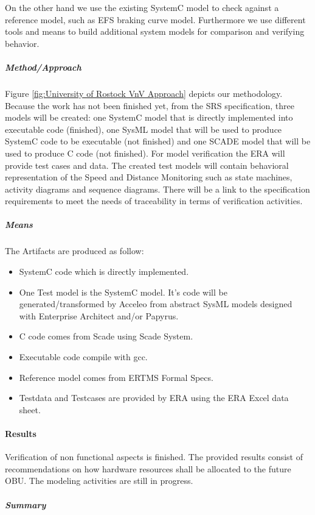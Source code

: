 \documentclass{article}
\begin{document}
On the other hand we use the existing SystemC model to check against a reference model, such as EFS braking curve model. Furthermore we use different tools and means to build additional system models for comparison and verifying behavior.

\subparagraph{Method/Approach}

Figure \ref{fig:University of Rostock VnV Approach} depicts our methodology. Because the work has not been finished yet, from the SRS
specification, three models will be created: one SystemC model that is directly implemented into executable code (finished), one SysML model that will be used to produce SystemC code to be executable (not finished) and one SCADE model that will be used to produce C code (not finished). For model verification the ERA will provide test cases and data. The created test models will contain behavioral representation of the Speed and Distance Monitoring such as state machines, activity diagrams and sequence diagrams. There will be a link to the specification requirements to meet the needs of traceability in terms of verification activities.


\subparagraph{Means}

The Artifacts are produced as follow:
\begin{itemize}
\item SystemC code which is directly implemented.
\item One Test model is the SystemC model. It's code will be generated/transformed by Acceleo from abstract SysML models designed with Enterprise Architect and/or Papyrus.
\item C code comes from Scade using Scade System.
\item Executable code compile with gcc.
\item Reference model comes from ERTMS Formal Specs.
\item Testdata and Testcases are provided by ERA using the ERA Excel data sheet.
\end{itemize}

\paragraph{Results}

Verification of non functional aspects is finished. The provided results consist of recommendations on how hardware resources shall be allocated to the future OBU. The modeling activities are still in progress.

\subparagraph{Summary}
\end{document}
